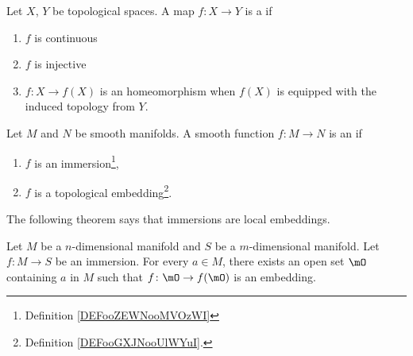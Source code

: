 \begin{definition}		\label{DEFooGXJNooUlWYuI}
	Let \( X\), \( Y\) be topological spaces. A map \( f\colon X\to Y\) is a  if
	\begin{enumerate}
		\item
		      \( f\) is continuous
		\item
		      \( f\) is injective
		\item
		      \( f\colon X\to f(X)\) is an homeomorphism when \( f(X)\) is equipped with the induced topology from \( Y\).
	\end{enumerate}
\end{definition}

\begin{definition}       \label{DEFooQLGLooNyXaOV}
	Let \( M\) and \( N\) be smooth manifolds. A smooth function \( f\colon M\to N\) is an  if
	\begin{enumerate}
		\item
		      \( f\) is an immersion\footnote{Definition \ref{DEFooZEWNooMVOzWI}},
		\item
		      \( f\) is a topological embedding\footnote{Definition \ref{DEFooGXJNooUlWYuI}.}.
	\end{enumerate}
\end{definition}

The following theorem says that immersions are local embeddings.
\begin{theorem}       \label{THOooXAOUooRKHMBm}
	Let \( M\) be a \( n\)-dimensional manifold and \( S\) be a \( m\)-dimensional manifold. Let \( f\colon M\to S\) be an immersion. For every \( a\in M\), there exists an open set \( \mO\) containing \( a\) in \( M\) such that \( f\colon \mO\to f(\mO)\) is an embedding.
\end{theorem}

